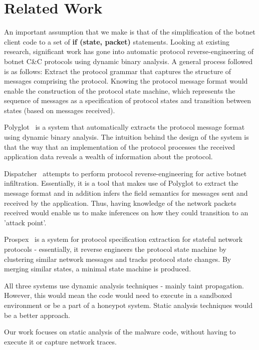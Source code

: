 \documentclass[twocolumn, 11pt]{paper}
\begin{document}
\section{Related Work}
An important assumption that we make is that of the simplification of the botnet client code to a set of \textbf{if (state, packet)} statements. Looking at existing research, significant work has gone into automatic protocol reverse-engineering of botnet C\&C protocols using dynamic binary analysis. A general process followed is as follows: Extract the protocol grammar that captures the structure of messages comprising the protocol. Knowing the protocol message format would enable the construction of the protocol state machine, which represents the sequence of messages as a specification of protocol states and transition between states (based on messages received).

Polyglot~\cite{polyglot} is a system that automatically extracts the protocol message format using dynamic binary analysis. The intuition behind the design of the system is that the  way  that  an  implementation  of  the protocol processes the received application data  reveals a wealth of information about the protocol.

Dispatcher~\cite{dispatcher} attempts to perform protocol reverse-engineering for active botnet infiltration. Essentially, it is a tool that makes use of Polyglot to extract the message format and in addition infers the field semantics for messages sent and received by the application. Thus, having knowledge of the network packets received would enable us to make inferences on how they could transition to an 'attack point'.

Prospex~\cite{prospex} is a system for protocol specification extraction for stateful network protocols - essentially, it reverse engineers the protocol state machine by clustering similar network messages and tracks protocol state changes. By merging similar states, a minimal state machine is produced.

All three systems use dynamic analysis techniques - mainly taint propagation. However, this would mean the code would need to execute in a sandboxed environment or be a part of a honeypot system. Static analysis techniques would be a better approach.

Our work focuses on static analysis of the malware code, without having to execute it or capture network traces.
\end{document}

